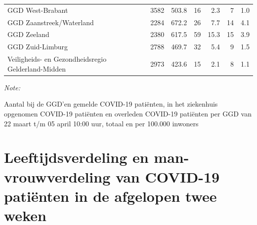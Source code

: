 \documentclass[
  english,
  man,floatsintext]{apa6}
\begin{document}
\begin{table}
\begin{threeparttable}
\begin{tabular}{lrrrrrr}
GGD West-Brabant & 3582 & 503.8 & 16 & 2.3 & 7 & 1.0\\
GGD Zaanstreek/Waterland & 2284 & 672.2 & 26 & 7.7 & 14 & 4.1\\
GGD Zeeland & 2380 & 617.5 & 59 & 15.3 & 15 & 3.9\\
GGD Zuid-Limburg & 2788 & 469.7 & 32 & 5.4 & 9 & 1.5\\
Veiligheids- en Gezondheidsregio Gelderland-Midden & 2973 & 423.6 & 15 & 2.1 & 8 & 1.1\\
\bottomrule
\end{tabular}
\begin{tablenotes}
\item \textit{Note: } 
\item Aantal bij de GGD’en gemelde COVID-19 patiënten, in het ziekenhuis opgenomen COVID-19 patiënten en overleden COVID-19 patiënten per GGD van 22 maart t/m 05 april 10:00 uur, totaal en per 100.000 inwoners
\end{tablenotes}
\end{threeparttable}
\endgroup{}
\end{table}

\newpage

\hypertarget{leeftijdsverdeling-en-man-vrouwverdeling-van-covid-19-patiuxebnten-in-de-afgelopen-twee-weken}{%
\section{Leeftijdsverdeling en man-vrouwverdeling van COVID-19 patiënten in de afgelopen twee weken}\label{leeftijdsverdeling-en-man-vrouwverdeling-van-covid-19-patiuxebnten-in-de-afgelopen-twee-weken}}
\end{document}
